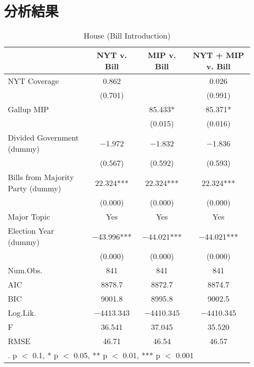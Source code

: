\documentclass[here]{article}
\begin{document}
\section{分析結果}
\begin{table}[h]
  \caption{House (Bill Introduction)}
  \centering
  \hspace{-1cm}

  \begin{tabular}[t]{lccc}
    \toprule
      & NYT v. Bill & MIP v. Bill & NYT + MIP v. Bill\\
    \midrule
    NYT Coverage & \num{0.862} &  & \num{0.026}\\
    & (\num{0.701}) &  & (\num{0.991})\\
    Gallup MIP &  & \num{85.433}* & \num{85.371}*\\
    &  & (\num{0.015}) & (\num{0.016})\\
    Divided Government (dummy) & \num{-1.972} & \num{-1.832} & \num{-1.836}\\
    & (\num{0.567}) & (\num{0.592}) & (\num{0.593})\\
    Bills from Majority Party (dummy) & \num{22.324}*** & \num{22.324}*** & \num{22.324}***\\
    & (\num{0.000}) & (\num{0.000}) & \vphantom{1} (\num{0.000})\\
    Major Topic & Yes & Yes & Yes\\
    Election Year (dummy) & \num{-43.996}*** & \num{-44.021}*** & \num{-44.021}***\\
    & (\num{0.000}) & (\num{0.000}) & (\num{0.000})\\
    Num.Obs. & \num{841} & \num{841} & \num{841}\\
    \midrule
    AIC & \num{8878.7} & \num{8872.7} & \num{8874.7}\\
    BIC & \num{9001.8} & \num{8995.8} & \num{9002.5}\\
    Log.Lik. & \num{-4413.343} & \num{-4410.345} & \num{-4410.345}\\
    F & \num{36.541} & \num{37.045} & \num{35.520}\\
    RMSE & \num{46.71} & \num{46.54} & \num{46.57}\\
    \bottomrule
    \multicolumn{4}{l}{\rule{0pt}{1em}. p $<$ 0.1, * p $<$ 0.05, ** p $<$ 0.01, *** p $<$ 0.001}\\
  \end{tabular}
  \end{table}
\end{document}
